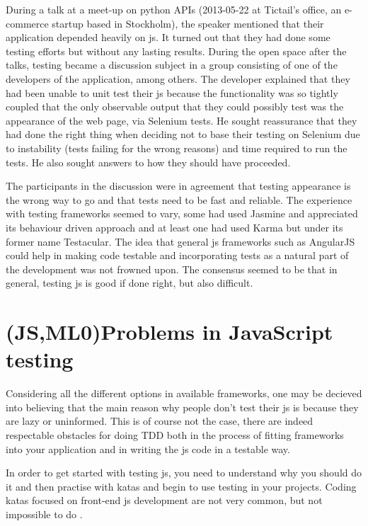 \documentclass[11pt]{article}
\begin{document}
During a talk at a meet-up on python APIs (2013-05-22 at Tictail's office, an e-commerce startup based in Stockholm), the speaker mentioned that their application depended heavily on \gls{js}. It turned out that they had done some testing efforts but without any lasting results. During the open space after the talks, testing became a discussion subject in a group consisting of one of the developers of the application, among others. The developer explained that they had been unable to unit test their \gls{js} because the functionality was so tightly coupled that the only observable output that they could possibly test was the appearance of the web page, via Selenium tests. He sought reassurance that they had done the right thing when deciding not to base their testing on Selenium due to instability (tests failing for the wrong reasons) and time required to run the tests. He also sought answers to how they should have proceeded.

The participants in the discussion were in agreement that testing appearance is the wrong way to go and that tests need to be fast and reliable. The experience with testing frameworks seemed to vary, some had used Jasmine and appreciated its behaviour driven approach and at least one had used Karma but under its former name Testacular. The idea that general \gls{js} frameworks such as AngularJS could help in making code testable and incorporating tests as a natural part of the development was not frowned upon. The consensus seemed to be that in general, testing \gls{js} is good if done right, but also difficult.


\section{(JS,ML0)Problems in JavaScript testing}
\label{sec:jsproblems}

Considering all the different options in available frameworks, one may be decieved into believing that the main reason why people don't test their \gls{js} is because they are lazy or uninformed. This is of course not the case, there are indeed respectable obstacles for doing TDD both in the process of fitting frameworks into your application and in writing the \gls{js} code in a testable way. %

In order to get started with testing \gls{js}, you need to understand why you should do it \cite[question~38]{Edelstam} and then practise with katas and begin to use testing in your projects. Coding katas focused on front-end \gls{js} development are not very common, but not impossible to do \cite[question~47]{Ahnve}.
\end{document}

